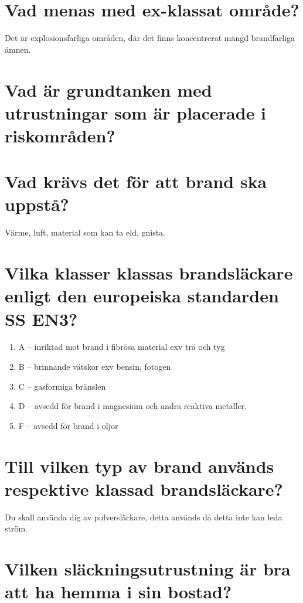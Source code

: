 \documentclass[a4paper,swedish]{article}
\begin{document}
\section{Vad menas med ex-klassat område?}
\label{sec:q_41}

Det är explosionsfarliga områden, där det finns koncentrerat mängd brandfarliga ämnen.

\section{Vad är grundtanken med utrustningar som är placerade i riskområden?}

\section{Vad krävs det för att brand ska uppstå?}
\label{sec:q_43}

Värme, luft, material som kan ta eld, gnista.

\section{Vilka klasser klassas brandsläckare enligt den europeiska standarden SS EN3?}

\begin{enumerate}
\item A -- inriktad mot brand i fibrösa material exv trä och tyg
\item B -- brinnande vätskor exv bensin, fotogen
\item C -- gasformiga bränslen
\item D -- avsedd för brand i magnesium och andra reaktiva metaller.
\item F -- avsedd för brand i oljor
\end{enumerate}

\section{Till vilken typ av brand används respektive klassad brandsläckare?}
\label{sec:q_45}

Du skall använda dig av pulversläckare, detta används då detta inte kan leda ström.

\section{Vilken släckningsutrustning är bra att ha hemma i sin bostad?}\label{sec:slackutrustning}
\end{document}
